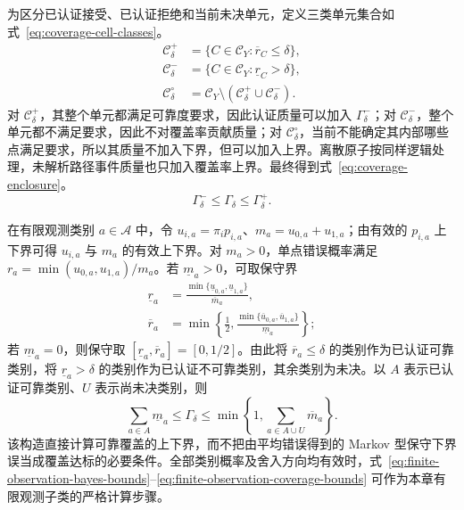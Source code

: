 \documentclass[master,fontset=ubuntu]{shnuthesis}
\theoremstyle{definition}
\begin{document}
为区分已认证接受、已认证拒绝和当前未决单元，定义三类单元集合如式~\eqref{eq:coverage-cell-classes}。
\begin{equation}
\begin{aligned}
\mathcal C_\delta^{+}
&=
\{C\in\mathcal C_Y:\overline r_C\leq\delta\},\\
\mathcal C_\delta^{-}
&=
\{C\in\mathcal C_Y:\underline r_C>\delta\},\\
\mathcal C_\delta^{\circ}
&=
\mathcal C_Y\setminus
\left(
\mathcal C_\delta^{+}
\cup
\mathcal C_\delta^{-}
\right).
\end{aligned}
\label{eq:coverage-cell-classes}
\end{equation}
对 \(\mathcal C_\delta^{+}\)，其整个单元都满足可靠度要求，因此认证质量可以加入 \(\Gamma_\delta^-\)；对 \(\mathcal C_\delta^{-}\)，整个单元都不满足要求，因此不对覆盖率贡献质量；对 \(\mathcal C_\delta^{\circ}\)，当前不能确定其内部哪些点满足要求，所以其质量不加入下界，但可以加入上界。离散原子按同样逻辑处理，未解析路径事件质量也只加入覆盖率上界。最终得到式~\eqref{eq:coverage-enclosure}。
\begin{equation}
\Gamma_\delta^-
\leq
\Gamma_\delta
\leq
\Gamma_\delta^+.
\label{eq:coverage-enclosure}
\end{equation}

在有限观测类别 \(a\in\mathcal A\) 中，令 \(u_{i,a}=\pi_i p_{i,a}\)、\(m_a=u_{0,a}+u_{1,a}\)；由有效的 \(p_{i,a}\) 上下界可得 \(u_{i,a}\) 与 \(m_a\) 的有效上下界。对 \(m_a>0\)，单点错误概率满足 \(r_a=\min(u_{0,a},u_{1,a})/m_a\)。若 \(\underline m_a>0\)，可取保守界
\begin{equation}
\begin{aligned}
\underline r_a&=\frac{\min\{\underline u_{0,a},\underline u_{1,a}\}}{\overline m_a},\\
\overline r_a&=\min\!\left\{\frac12,\frac{\min\{\overline u_{0,a},\overline u_{1,a}\}}{\underline m_a}\right\};
\end{aligned}
\label{eq:finite-observation-posterior-bounds}
\end{equation}
若 \(\underline m_a=0\)，则保守取 \([\underline r_a,\overline r_a]=[0,1/2]\)。由此将 \(\overline r_a\leq\delta\) 的类别作为已认证可靠类别，将 \(\underline r_a>\delta\) 的类别作为已认证不可靠类别，其余类别为未决。以 \(A\) 表示已认证可靠类别、\(U\) 表示尚未决类别，则
\begin{equation}
\sum_{a\in A}\underline m_a
\leq\Gamma_\delta\leq
\min\!\left\{1,\sum_{a\in A\cup U}\overline m_a\right\}.
\label{eq:finite-observation-coverage-bounds}
\end{equation}
该构造直接计算可靠覆盖的上下界，而不把由平均错误得到的 Markov 型保守下界误当成覆盖达标的必要条件。全部类别概率及舍入方向均有效时，式~\eqref{eq:finite-observation-bayes-bounds}--\eqref{eq:finite-observation-coverage-bounds} 可作为本章有限观测子类的严格计算步骤。
\end{document}
